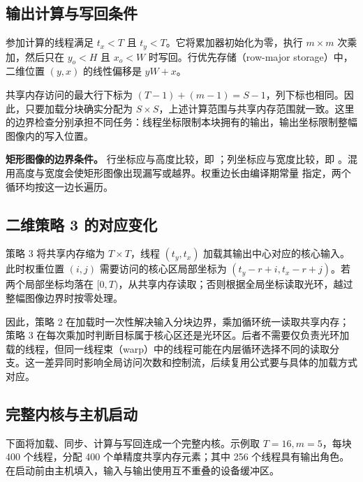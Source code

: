 \subsection{输出计算与写回条件}
参加计算的线程满足 $t_x<T$ 且 $t_y<T$。它将累加器初始化为零，执行 $m\times m$ 次乘加，然后只在 $y_o<H$ 且 $x_o<W$ 时写回。行优先存储（row-major storage）中，二维位置 $(y,x)$ 的线性偏移是 $yW+x$。

共享内存访问的最大行下标为 $(T-1)+(m-1)=S-1$，列下标也相同。因此，只要加载分块确实分配为 $S\times S$，上述计算范围与共享内存范围就一致。这里的边界检查分别承担不同任务：线程坐标限制本块拥有的输出，输出坐标限制整幅图像内的写入位置。

\textbf{矩形图像的边界条件。} 行坐标应与高度比较，即 \mbox{}；列坐标应与宽度比较，即 \mbox{}。混用高度与宽度会使矩形图像出现漏写或越界。权重边长由编译期常量 \mbox{} 指定，两个循环均按这一边长遍历。

\subsection{二维策略 3 的对应变化}
策略 3 将共享内存缩为 $T\times T$，线程 $(t_y,t_x)$ 加载其输出中心对应的核心输入。此时权重位置 $(i,j)$ 需要访问的核心区局部坐标为 $(t_y-r+i,t_x-r+j)$。若两个局部坐标均落在 $[0,T)$，从共享内存读取；否则根据全局坐标读取光环，越过整幅图像边界时按零处理。

因此，策略 2 在加载时一次性解决输入分块边界，乘加循环统一读取共享内存；策略 3 在每次乘加时判断目标属于核心区还是光环区。后者不需要仅负责光环加载的线程，但同一线程束（warp）中的线程可能在内层循环选择不同的读取分支。这一差异同时影响全局访问次数和控制流，后续复用公式要与具体的加载方式对应。

\subsection{完整内核与主机启动}
\label{l9:subsec:complete-kernel}
下面将加载、同步、计算与写回连成一个完整内核。示例取 $T=16,m=5$，每块 400 个线程，分配 400 个单精度共享内存元素；其中 256 个线程具有输出角色。\mbox{} 在启动前由主机填入，输入与输出使用互不重叠的设备缓冲区。

\noindent\begin{minipage}{\textwidth}

\end{minipage}

